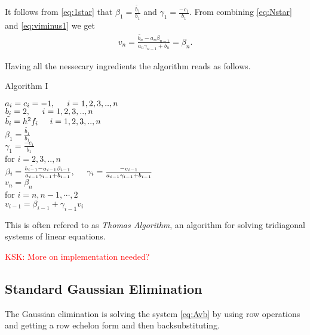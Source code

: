 \documentclass[11pt,a4paper,english,final]{article}
\numberwithin{equation}{section}
\begin{document}
It follows from \eqref{eq:1star} that $\beta_1 = \frac{\tilde{b_1}}{b_1}$ and $\gamma_1 = \frac{-c_1}{b_1}$.
From combining \eqref{eq:Nstar} and \eqref{eq:viminus1} we get 
\begin{align*}
v_n = \frac{\tilde{b_n}-a_n \beta_{n-1}}{a_n \gamma_{n-1} + b_n} = \beta_{n}.
\end{align*}

Having all the nessecary ingredients the algorithm reads as follows.
\vspace{0.5cm}

\centerline{Algorithm I}
\begin{tcolorbox}
$a_i = c_i = -1, \hspace{0.5cm}  i=1,2,3,..,n$\\
$b_i = 2, \hspace{0.5cm}  i=1,2,3,..,n $\\
$\tilde{b_i} = h^2 f_i \hspace{0.5cm}  i=1,2,3,..,n $\\
$\beta_1 = \frac{\tilde{b_1}}{b_1}$ \\
$\gamma_1 = \frac{-c_1}{b_1}$ \\
for $i=2,3,..,n$ \\ \vspace{0.5cm} 
 \hspace{0.5cm} $ \beta_{i} = \frac{\tilde{b_{i-1}}-a_{i-1} \beta_{i-1}}{a_{i-1} \gamma_{i-1} + b_{i-1}} , \hspace{0.5cm} \gamma_{i}=\frac{-c_{i-1}}{a_{i-1} \gamma_{i-1} + b_{i-1}} $ \vspace{0.2cm}  \\
 $v_{n} = \beta_{n}$\\
for $i=n, n-1, \cdots ,2$\\ \vspace{0.5cm} 
 \hspace{0.5cm} $v_{i-1} = \beta_{i-1} + \gamma_{i-1} v_i$
\end{tcolorbox} 


This is often refered to as \emph{Thomas Algorithm}, an algorithm for solving tridiagonal systems of linear equations. 

\textcolor{red}{KSK: More on implementation needed?}

\subsection{Standard Gaussian Elimination}

The Gaussian elimination is solving the system \eqref{eq:Avb} by using 
row operations and getting a row echelon form and then backsubstituting.
\end{document}
